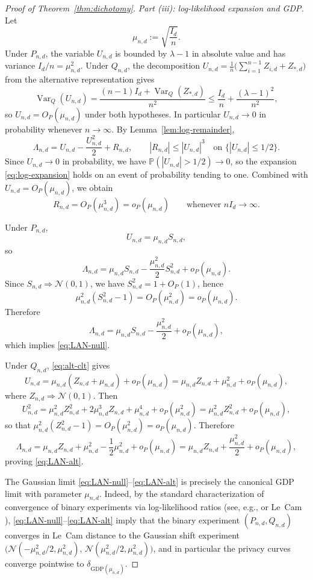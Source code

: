 \documentclass[11pt]{amsart}
\numberwithin{equation}{section}
\theoremstyle{definition}
\newcommand{\PP}{\mathbb P}
\newcommand{\GDP}{\mathrm{GDP}}
\newcommand{\Normal}{\mathcal N}
\DeclareMathOperator{\Var}{Var}
\begin{document}
\begin{proof}[Proof of Theorem~\ref{thm:dichotomy}]
\smallskip
\noindent\emph{Part (iii): log-likelihood expansion and GDP.}
Let
\[
\mu_{n,d}:=\sqrt{\frac{I_d}{n}}.
\]
Under $P_{n,d}$, the variable $U_{n,d}$ is bounded by $\lambda-1$ in absolute value and
has variance $I_d/n=\mu_{n,d}^2$.
Under $Q_{n,d}$, the decomposition $U_{n,d}=\frac{1}{n}\bigl(\sum_{i=1}^{n-1}Z_{i,d}+Z_{*,d}\bigr)$
from the alternative representation gives
\[
\Var_Q(U_{n,d})
=
\frac{(n-1)I_d+\Var_Q(Z_{*,d})}{n^2}
\le
\frac{I_d}{n}+\frac{(\lambda-1)^2}{n^2},
\]
so $U_{n,d}=O_P(\mu_{n,d})$ under both hypotheses.
In particular \(U_{n,d}\to 0\) in probability whenever \(n\to\infty\).
By Lemma~\ref{lem:log-remainder},
\[
\Lambda_{n,d}
=
U_{n,d}-\frac{U_{n,d}^2}{2}+R_{n,d},
\qquad
|R_{n,d}|\le |U_{n,d}|^3
\quad\text{on }\{|U_{n,d}|\le 1/2\}. \tag{6.20}\label{eq:log-expansion}
\]
Since \(U_{n,d}\to 0\) in probability, we have \(\PP(|U_{n,d}|>1/2)\to 0\),
so the expansion \eqref{eq:log-expansion} holds on an event of probability tending to one.
Combined with \(U_{n,d}=O_P(\mu_{n,d})\), we obtain
\[
R_{n,d}=O_P(\mu_{n,d}^3)=o_P(\mu_{n,d})
\qquad\text{whenever } nI_d\to\infty. \tag{6.21}\label{eq:R-small}
\]

Under $P_{n,d}$,
\[
U_{n,d}=\mu_{n,d} S_{n,d},
\]
so
\[
\Lambda_{n,d}
=
\mu_{n,d} S_{n,d}-\frac{\mu_{n,d}^2}{2}S_{n,d}^2+o_P(\mu_{n,d}).
\]
Since \(S_{n,d}\Rightarrow \Normal(0,1)\), we have \(S_{n,d}^2=1+O_P(1)\), hence
\[
\mu_{n,d}^2(S_{n,d}^2-1)=O_P(\mu_{n,d}^2)=o_P(\mu_{n,d}).
\]
Therefore
\[
\Lambda_{n,d}
=
\mu_{n,d}S_{n,d}-\frac{\mu_{n,d}^2}{2}+o_P(\mu_{n,d}),
\]
which implies \eqref{eq:LAN-null}.

Under $Q_{n,d}$, \eqref{eq:alt-clt} gives
\[
U_{n,d}
=
\mu_{n,d}\left(Z_{n,d}+\mu_{n,d}\right)+o_P(\mu_{n,d})
=
\mu_{n,d} Z_{n,d}+\mu_{n,d}^2+o_P(\mu_{n,d}),
\]
where \(Z_{n,d}\Rightarrow \Normal(0,1)\).
Then
\[
U_{n,d}^2
=
\mu_{n,d}^2 Z_{n,d}^2+2\mu_{n,d}^3 Z_{n,d}+\mu_{n,d}^4+o_P(\mu_{n,d}^2)
=
\mu_{n,d}^2 Z_{n,d}^2+o_P(\mu_{n,d}),
\]
so that \(\mu_{n,d}^2(Z_{n,d}^2-1)=O_P(\mu_{n,d}^2)=o_P(\mu_{n,d})\).
Therefore
\[
\Lambda_{n,d}
=
\mu_{n,d} Z_{n,d}+\mu_{n,d}^2
-\frac12\mu_{n,d}^2+o_P(\mu_{n,d})
=
\mu_{n,d} Z_{n,d}+\frac{\mu_{n,d}^2}{2}+o_P(\mu_{n,d}),
\]
proving \eqref{eq:LAN-alt}.

The Gaussian limit \eqref{eq:LAN-null}--\eqref{eq:LAN-alt} is precisely the canonical GDP limit with
parameter \(\mu_{n,d}\).
Indeed, by the standard characterization of convergence of binary experiments via log-likelihood ratios
(see, e.g., \cite[Theorem~4.1]{ShvetsPartI} or Le~Cam \cite[Ch.~8]{LeCam1986}),
\eqref{eq:LAN-null}--\eqref{eq:LAN-alt} imply that the binary experiment
\((P_{n,d},Q_{n,d})\) converges in Le~Cam distance to the Gaussian shift experiment
\(\bigl(\Normal(-\mu_{n,d}^2/2,\mu_{n,d}^2),\,\Normal(\mu_{n,d}^2/2,\mu_{n,d}^2)\bigr)\),
and in particular the privacy curves converge pointwise to \(\delta_{\GDP(\mu_{n,d})}\).


\end{proof}
\end{document}
